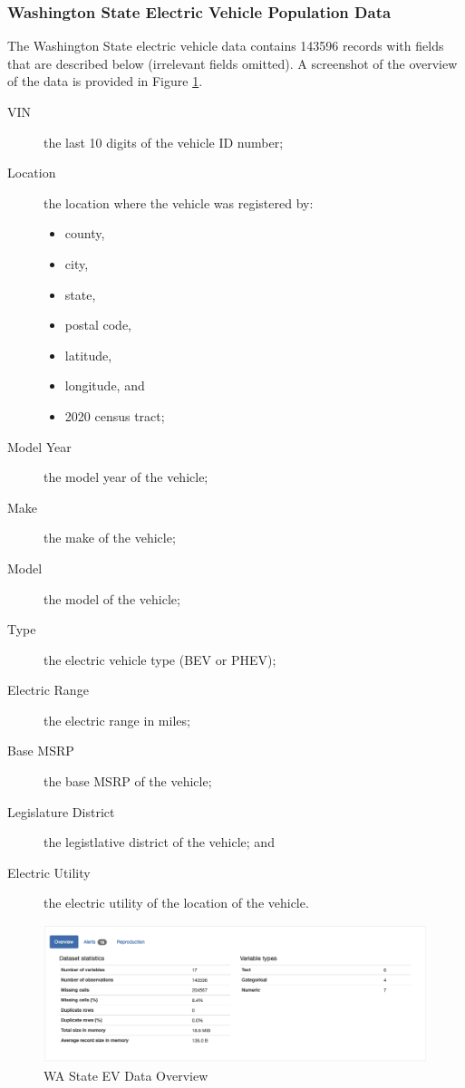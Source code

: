 \documentclass{article}
\begin{document}
\subsubsection{Washington State Electric Vehicle Population Data}
The Washington State electric vehicle data contains 143596 records with
fields that are described below (irrelevant fields omitted).  A screenshot of
the overview of the data is provided in Figure \ref{fig:wa_ev}.
\begin{description}
    \item[VIN] the last 10 digits of the vehicle ID number;
    \item[Location] the location where the vehicle was registered by:
    \begin{itemize}
        \item county,
        \item city,
        \item state,
        \item postal code,
        \item latitude,
        \item longitude, and
        \item 2020 census tract;
    \end{itemize}
    \item[Model Year] the model year of the vehicle;
    \item[Make] the make of the vehicle;
    \item[Model] the model of the vehicle;
    \item[Type] the electric vehicle type (BEV or PHEV);
    \item[Electric Range] the electric range in miles;
    \item[Base MSRP] the base MSRP of the vehicle;
    \item[Legislature District] the legistlative district of the vehicle; and
    \item[Electric Utility] the electric utility of the location of the vehicle.
\end{description}

\begin{figure}[ht]
    \centering
    \includegraphics[scale=0.3]{wa_ev.png}
    \caption{WA State EV Data Overview}
    \label{fig:wa_ev}
\end{figure}
\end{document}
